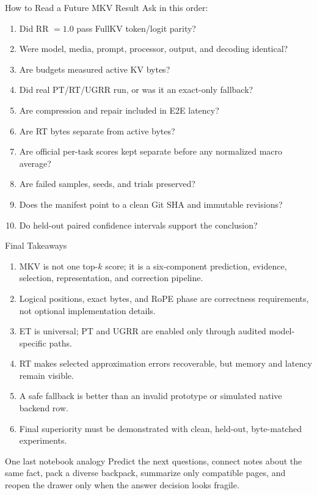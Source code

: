 \documentclass[aspectratio=169,10pt]{beamer}
\newcommand{\tightitems}{\setlength{\itemsep}{0.28em}\setlength{\parskip}{0pt}}
\begin{document}
\begin{frame}{How to Read a Future MKV Result}
\scriptsize
Ask in this order:
\begin{enumerate}\tightitems
  \item Did RR $=1.0$ pass FullKV token/logit parity?
  \item Were model, media, prompt, processor, output, and decoding identical?
  \item Are budgets measured active KV bytes?
  \item Did real PT/RT/UGRR run, or was it an exact-only fallback?
  \item Are compression and repair included in E2E latency?
  \item Are RT bytes separate from active bytes?
  \item Are official per-task scores kept separate before any normalized macro average?
  \item Are failed samples, seeds, and trials preserved?
  \item Does the manifest point to a clean Git SHA and immutable revisions?
  \item Do held-out paired confidence intervals support the conclusion?
\end{enumerate}
\end{frame}

\begin{frame}{Final Takeaways}
\small
\begin{enumerate}\tightitems
  \item MKV is not one top-$k$ score; it is a six-component prediction, evidence, selection,
        representation, and correction pipeline.
  \item Logical positions, exact bytes, and RoPE phase are correctness requirements, not optional
        implementation details.
  \item ET is universal; PT and UGRR are enabled only through audited model-specific paths.
  \item RT makes selected approximation errors recoverable, but memory and latency remain visible.
  \item A safe fallback is better than an invalid prototype or simulated native backend row.
  \item Final superiority must be demonstrated with clean, held-out, byte-matched experiments.
\end{enumerate}
\begin{exampleblock}{One last notebook analogy}
Predict the next questions, connect notes about the same fact, pack a diverse backpack, summarize
only compatible pages, and reopen the drawer only when the answer decision looks fragile.
\end{exampleblock}
\end{frame}
\end{document}
